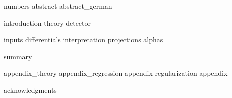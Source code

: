 \documentclass[draftmode]{main}
\begin{document}
{numbers}
{abstract}
{abstract_german}

\tableofcontents

{introduction}
{theory}
{detector}

{inputs}
{differentials}
{interpretation}
{projections}
{alphas}

{summary}




\appendix
{appendix_theory}
{appendix_regression}
{appendix}
{regularization}
{appendix}

{acknowledgments}
\end{document}
